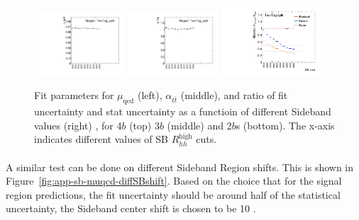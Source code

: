 \begin{figure}[htbp!]
\begin{center}
\includegraphics[angle=270, width=0.3\textwidth]{./figures/boosted/Appendix_SB/TwoTag_split_muqcdSB.pdf}
\includegraphics[angle=270, width=0.3\textwidth]{./figures/boosted/Appendix_SB/TwoTag_split_mutopSB.pdf}
\includegraphics[angle=270, width=0.33\textwidth]{./figures/boosted/Appendix_SB/data_est_TwoTag_split_sigma_compareSB.pdf}
  \caption{Fit parameters for $\mu_{\text{qcd}}$ (left), $\alpha_{t\bar{t}}$ (middle), and ratio of fit uncertainty and stat uncertainty as a functioin of different Sideband values (right) , for 4$b$ (top) 3$b$ (middle) and 2$b$s (bottom). The x-axis indicates different values of SB $R_{hh}^{\text{high}}$ cuts.}
  \label{fig:app-sb-muqcd-diffSB}
\end{center}
\end{figure}


\paragraph{} A similar test can be done on different Sideband Region shifts. This is shown in Figure~\ref{fig:app-sb-muqcd-diffSBshift}. Based on the choice that for the signal region predictions, the fit uncertainty should be around half of the statistical uncertainty, the Sideband center shift is chosen to be 10 \GeV.

